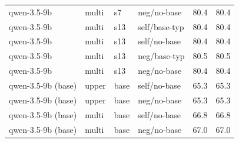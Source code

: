 {\begin{longtable}{llll rr}
qwen-3.5-9b & multi & s7 & neg/no-base & 80.4 & 80.4 \\
qwen-3.5-9b & multi & s13 & self/base-typ & 80.4 & 80.4 \\
qwen-3.5-9b & multi & s13 & self/no-base & 80.4 & 80.4 \\
qwen-3.5-9b & multi & s13 & neg/base-typ & 80.5 & 80.5 \\
qwen-3.5-9b & multi & s13 & neg/no-base & 80.4 & 80.4 \\
\midrule
qwen-3.5-9b (base) & upper & base & self/no-base & 65.3 & 65.3 \\
qwen-3.5-9b (base) & upper & base & neg/no-base & 65.3 & 65.3 \\
\midrule
qwen-3.5-9b (base) & multi & base & self/no-base & 66.8 & 66.8 \\
qwen-3.5-9b (base) & multi & base & neg/no-base & 67.0 & 67.0 \\
\bottomrule
\end{longtable}
}
